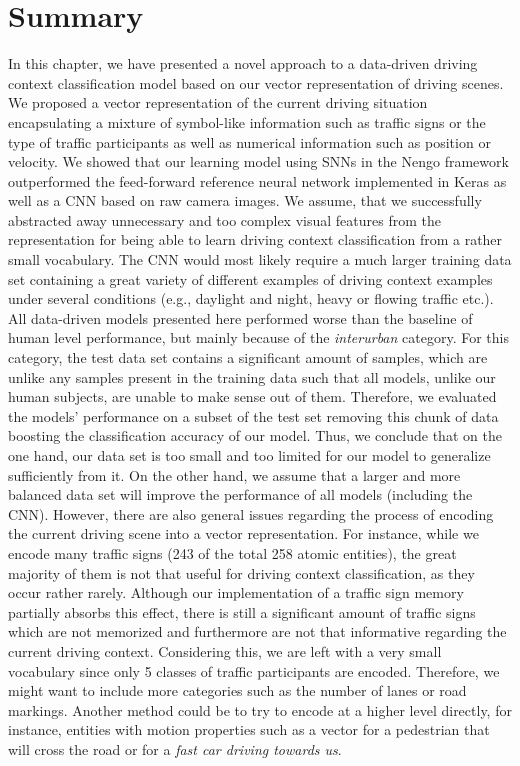 \section{Summary}%
\label{sec:summary_context_classification}

In this chapter, we have presented a novel approach to a data-driven driving context classification model based on our vector representation of driving scenes.
We proposed a vector representation of the current driving situation encapsulating a mixture of symbol-like information such as traffic signs or the type of traffic participants as well as numerical information such as position or velocity.
We showed that our learning model using \acp{SNN} in the \ac{Nengo} framework outperformed the feed-forward reference neural network implemented in Keras as well as a \ac{CNN} based on raw camera images.
We assume, that we successfully abstracted away unnecessary and too complex visual features from the representation for being able to learn driving context classification from a rather small vocabulary.
The \ac{CNN} would most likely require a much larger training data set containing a great variety of different examples of driving context examples under several conditions (e.g., daylight and night, heavy or flowing traffic etc.).
All data-driven models presented here performed worse than the baseline of human level performance, but mainly because of the \emph{interurban} category.
For this category, the test data set contains a significant amount of samples, which are unlike any samples present in the training data such that all models, unlike our human subjects, are unable to make sense out of them.
Therefore, we evaluated the models' performance on a subset of the test set removing this chunk of data boosting the classification accuracy of our model.
Thus, we conclude that on the one hand, our data set is too small and too limited for our model to generalize sufficiently from it.
On the other hand, we assume that a larger and more balanced data set will improve the performance of all models (including the \ac{CNN}). 
However, there are also general issues regarding the process of encoding the current driving scene into a vector representation.
For instance, while we encode many traffic signs (\num{243} of the total \num{258} atomic entities), the great majority of them is not that useful for driving context classification, as they occur rather rarely.
Although our implementation of a traffic sign memory partially absorbs this effect, there is still a significant amount of traffic signs which are not memorized and furthermore are not that informative regarding the current driving context.
Considering this, we are left with a very small vocabulary since only \num{5} classes of traffic participants are encoded.
Therefore, we might want to include more categories such as the number of lanes or road markings.
Another method could be to try to encode at a higher level directly, for instance, entities with motion properties such as a vector for a pedestrian that will cross the road or for a \emph{fast car driving towards us}.

